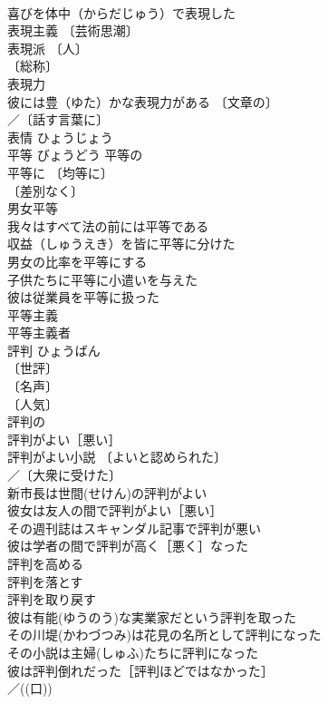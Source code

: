 \documentclass[8pt]{extreport}
\begin{document}
\begin{CJK}{UTF8}{min}
\\	喜びを体中（からだじゅう）で表現した 
\\	表現主義 〔芸術思潮〕
\\	表現派 〔人〕
\\	〔総称〕
\\	表現力 
\\	彼には豊（ゆた）かな表現力がある 〔文章の〕
\\	／〔話す言葉に〕
\\	表情	ひょうじょう	
\\	平等	びょうどう	平等の 
\\	平等に 〔均等に〕
\\	〔差別なく〕
\\	男女平等 
\\	我々はすべて法の前には平等である 
\\	収益（しゅうえき）を皆に平等に分けた 
\\	男女の比率を平等にする 
\\	子供たちに平等に小遣いを与えた 
\\	彼は従業員を平等に扱った 
\\	平等主義 
\\	平等主義者 
\\	評判	ひょうばん	
\\	〔世評〕
\\	〔名声〕
\\	〔人気〕
\\	評判の 
\\	評判がよい［悪い］ 
\\	評判がよい小説 〔よいと認められた〕
\\	／〔大衆に受けた〕
\\	新市長は世間(せけん)の評判がよい 
\\	彼女は友人の間で評判がよい［悪い］ 
\\	その週刊誌はスキャンダル記事で評判が悪い 
\\	彼は学者の間で評判が高く［悪く］なった 
\\	評判を高める 
\\	評判を落とす 
\\	評判を取り戻す 
\\	彼は有能(ゆうのう)な実業家だという評判を取った 
\\	その川堤(かわづつみ)は花見の名所として評判になった 
\\	その小説は主婦(しゅふ)たちに評判になった 
\\	彼は評判倒れだった［評判ほどではなかった］ 
\\	／((口)) 

\end{CJK}
\end{document}
